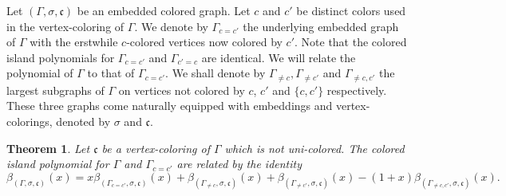 \documentclass[10pt, reqno]{amsart}
\newcommand{\hf}{\hspace*{0.5cm}}
\theoremstyle{plain}
\newtheorem{theorem}{Theorem}[section]
\newtheorem{cor}[theorem]{Corollary}
\theoremstyle{remark}
\theoremstyle{definition}
\numberwithin{equation}{section}
\begin{document}
\hf Let $(\Gamma,\sigma, \mathfrak{c})$ be an embedded colored graph. Let $c$ and $c'$ be distinct colors used in the vertex-coloring of $\Gamma$. We denote by $\Gamma_{c=c'}$ the underlying embedded graph of $\Gamma$ with the erstwhile $c$-colored vertices now colored by $c'$. Note that the colored island polynomials for $\Gamma_{c=c'}$ and $\Gamma_{c'=c}$ are identical. We will relate the polynomial of $\Gamma$ to that of $\Gamma_{c=c'}$. We shall denote by $\Gamma_{\neq c},\Gamma_{\neq c'}$ and $\Gamma_{\neq c,c'}$ the largest subgraphs of $\Gamma$ on vertices not colored by $c$, $c'$ and $\{c,c'\}$ respectively. These three graphs come naturally equipped with embeddings and vertex-colorings, denoted by $\sigma$ and $\mathfrak{c}$.
\begin{theorem}\label{thm:color}
Let $\mathfrak{c}$ be a vertex-coloring of $\Gamma$ which is not uni-colored. The colored island polynomial for $\Gamma$ and $\Gamma_{c=c'}$ are related by the identity
\begin{equation}\label{eqn:ver-col}
{\beta}_{(\Gamma,\sigma,\mathfrak{c})}(x)=x{\beta}_{(\Gamma_{c=c'},\sigma,\mathfrak{c})}(x)+{\beta}_{(\Gamma_{\neq c},\sigma,\mathfrak{c})}(x)+{\beta}_{(\Gamma_{\neq c'},\sigma,\mathfrak{c})}(x)-(1+x){\beta}_{(\Gamma_{\neq c,c'},\sigma,\mathfrak{c})}(x).
\end{equation}
\end{theorem}
\end{document}
